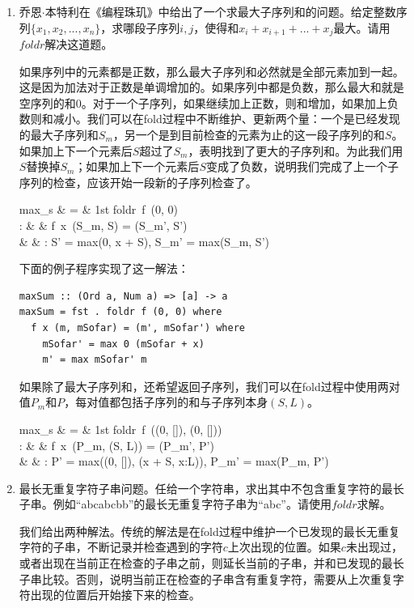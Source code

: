 \documentclass[UTF8]{article}
\begin{document}
\begin{enumerate}
\item 乔恩$\cdot$本特利在《编程珠玑》中给出了一个求最大子序列和的问题。给定整数序列$\{x_1, x_2, ..., x_n\}$，求哪段子序列$i, j$，使得和$x_i + x_{i+1} + ... + x_j$最大。请用$foldr$解决这道题。

如果序列中的元素都是正数，那么最大子序列和必然就是全部元素加到一起。这是因为加法对于正数是单调增加的。如果序列中都是负数，那么最大和就是空序列的和0。对于一个子序列，如果继续加上正数，则和增加，如果加上负数则和减小。我们可以在fold过程中不断维护、更新两个量：一个是已经发现的最大子序列和$S_m$，另一个是到目前检查的元素为止的这一段子序列的和$S$。如果加上下一个元素后$S$超过了$S_m$，表明找到了更大的子序列和。为此我们用$S$替换掉$S_m$；如果加上下一个元素后$S$变成了负数，说明我们完成了上一个子序列的检查，应该开始一段新的子序列检查了。

\blre
max_s & = & 1st \cdot foldr\ f\ (0, 0) \\
: & & f\ x\ (S_m, S) = (S_m', S') \\
& & :  S' = max(0, x + S), S_m' = max(S_m, S') \\
\elre

下面的例子程序实现了这一解法：

\lstset{frame=single}
\begin{lstlisting}
maxSum :: (Ord a, Num a) => [a] -> a
maxSum = fst . foldr f (0, 0) where
  f x (m, mSofar) = (m', mSofar') where
    mSofar' = max 0 (mSofar + x)
    m' = max mSofar' m
\end{lstlisting}

如果除了最大子序列和，还希望返回子序列，我们可以在fold过程中使用两对值$P_m$和$P$，每对值都包括子序列的和与子序列本身$(S, L)$。

\blre
max_s & = & 1st \cdot foldr\ f\ ((0, []), (0, [])) \\
: & & f\ x\ (P_m, (S, L)) = (P_m', P') \\
& & :  P' = max((0, []), (x + S, x:L)), P_m' = max(P_m, P') \\
\elre

\item 最长无重复字符子串问题。任给一个字符串，求出其中不包含重复字符的最长子串。例如``abcabcbb''的最长无重复字符子串为``abc''。请使用$foldr$求解。

我们给出两种解法。传统的解法是在fold过程中维护一个已发现的最长无重复字符的子串，不断记录并检查遇到的字符$c$上次出现的位置。如果$c$未出现过，或者出现在当前正在检查的子串之前，则延长当前的子串，并和已发现的最长子串比较。否则，说明当前正在检查的子串含有重复字符，需要从上次重复字符出现的位置后开始接下来的检查。


\end{enumerate}
\end{document}
